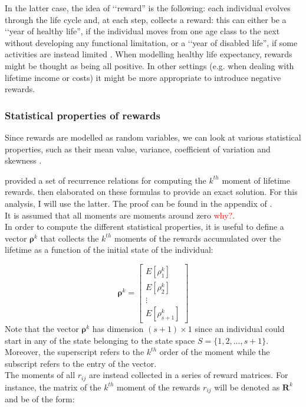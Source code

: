 \documentclass[\main/main.tex]{subfiles}
\begin{document}
In the latter case, the idea of \lq\lq reward'' is the following: each individual evolves through the life cycle and, at each step, collects a reward: this can either be a \lq\lq year of healthy life'', if the individual moves from one age class to the next without developing any functional limitation, or a \lq\lq year of disabled life'', if some activities are instead limited \citep{Caswell2018}. When modelling healthy life expectancy, rewards might be thought as being all positive. In other settings (e.g. when dealing with lifetime income or costs) it might be more appropriate to introduce negative rewards.



\subsubsection{Statistical properties of rewards}

Since rewards are modelled as random variables, we can look at various statistical properties, such as their mean value, variance, coefficient of variation and skewness \citep{Caswell2018}.

\cite{Caswell2011} provided a set of recurrence relations for computing the $k^{th}$ moment of lifetime rewards. \cite{VanDaalen2017} then elaborated on these formulas to provide an exact solution.  For this analysis, I will use the latter. The proof can be found in the appendix of \cite{VanDaalen2017} .\\

It is assumed that all moments are moments around zero \citep{Caswell2018} \textcolor{red}{why?}.\\
In order to compute the different statistical properties, it is useful to define a vector  $\bm{\rho}^k$ that collects the $k^{th}$ moments of the rewards accumulated over the lifetime as a function of the initial state of the individual:

\begin{equation}
 \bm{\rho}^{k} =
\begin{bmatrix}
E[\rho^k_1]\\
E[\rho^k_2]\\
\vdots\\
E[\rho^k_{s+1}]
\end{bmatrix}
\end{equation}
Note that the vector $\bm{\rho}^k$ has dimension $(s+1) \times 1$ since an individual could start in any of the state belonging to the state space $S = \{1,2,..., s+1\}$. Moreover, the superscript refers to the $k^{th}$ order of the moment while the subscript refers to the entry of the vector. \\
The moments of all $r_{ij}$ are instead collected in a series of reward matrices. For instance, the matrix of the $k^{th}$ moment of the rewards $r_{ij}$ will be denoted as $\mathbf{R}^k$ and be of the form:
\end{document}
